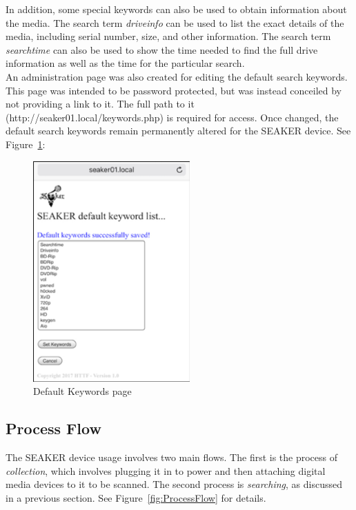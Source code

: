 \documentclass[12pt]{article}
\begin{document}
In addition, some special keywords can also be used to obtain information
about the media.  The search term {\em driveinfo} can be used to list the exact details of
the media, including serial number, size, and other information.
The search term {\em searchtime} can also be used to show the time needed to find the
full drive information as well as the time for the particular search.\\

An administration page was also created for editing the default search keywords.
This page was intended to be password protected, but was instead conceiled by not
providing a link to it.  The full path to it (http://seaker01.local/keywords.php)
is required for access.  Once changed, the default search keywords remain permanently
altered for the SEAKER device.  See Figure~\ref{fig:DefaultKeywords}:\\

\begin{figure}[H]
  \begin{center}
  \includegraphics[width=6cm]{images/DefaultKeywords.png}
  \caption{Default Keywords page}
  \label{fig:DefaultKeywords}
  \end{center}
\end{figure}

\subsection{Process Flow}

The SEAKER device usage involves two main flows.  The first is the 
process of {\em collection}, which involves plugging it in to power
and then attaching digital media devices to it to be scanned.
The second process is {\em searching}, as discussed in a
previous section.
See Figure~\ref{fig:ProcessFlow} for details.
\end{document}
